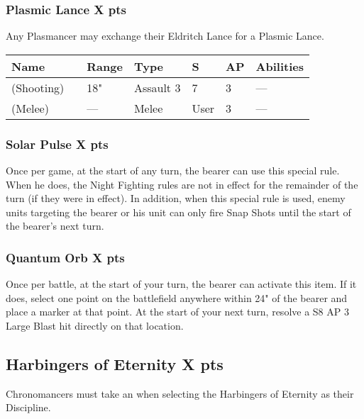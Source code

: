 \subsubsection[Plasmic Lance ]{Plasmic Lance  \hrulefill X pts}

Any Plasmancer may exchange their Eldritch Lance for a Plasmic Lance.

\label{Plasmic Lance}
\noindent
\begin{tabular}{||m{130pt} m{10pt} m{31pt} m{55pt} m{12pt} m{12pt} m{210pt}||}
	\hline
	Name & & Range & Type & S & AP & Abilities \\
	\hline
	\quickref{Plasmic Lance} (Shooting) & & 18" & Assault 3 & 7 & 3 & — \\
	\quickref{Plasmic Lance} (Melee) & & — & Melee & User & 3 & — \\
	\hline
\end{tabular}

\subsubsection[Solar Pulse ]{Solar Pulse  \hrulefill X pts}

Once per game, at the start of any turn, the bearer can use this special rule. When he does, the Night Fighting rules are not in effect for the remainder of the turn (if they were in effect). In addition, when this special rule is used, enemy units targeting the bearer or his unit can only fire Snap Shots until the start of the bearer’s next turn.

\subsubsection[Quantum Orb ]{Quantum Orb  \hrulefill X pts}

Once per battle, at the start of your turn, the bearer can activate this item. If it does, select one point on the battlefield anywhere within 24" of the bearer and place a marker at that point. At the start of your next turn, resolve a S8 AP 3 Large Blast hit directly on that location. %


\subsection[Harbingers of Eternity ]{Harbingers of Eternity  \hrulefill X pts}

Chronomancers must take an  when selecting the Harbingers of Eternity as their Discipline.

